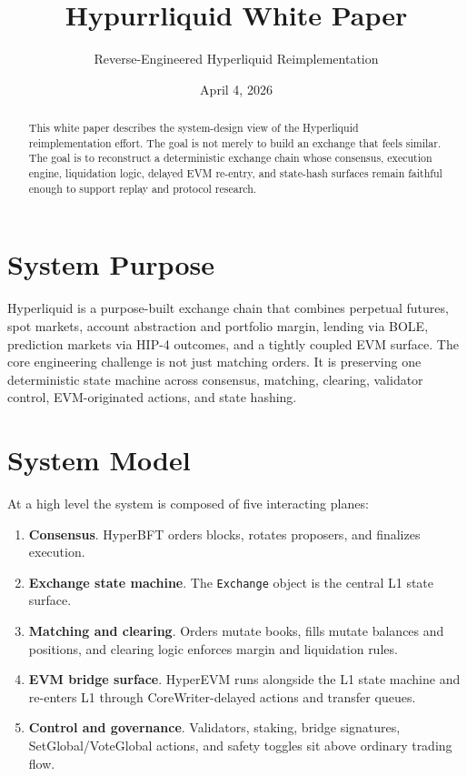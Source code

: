 \documentclass[11pt]{article}
\title{\textbf{Hypurrliquid White Paper}}
\author{Reverse-Engineered Hyperliquid Reimplementation}
\date{April 4, 2026}
\begin{document}
\maketitle

\begin{abstract}
This white paper describes the system-design view of the Hyperliquid
reimplementation effort. The goal is not merely to build an exchange that feels
similar. The goal is to reconstruct a deterministic exchange chain whose
consensus, execution engine, liquidation logic, delayed EVM re-entry, and
state-hash surfaces remain faithful enough to support replay and protocol
research.
\end{abstract}

\section{System Purpose}

Hyperliquid is a purpose-built exchange chain that combines perpetual futures,
spot markets, account abstraction and portfolio margin, lending via BOLE,
prediction markets via HIP-4 outcomes, and a tightly coupled EVM surface. The
core engineering challenge is not just matching orders. It is preserving one
deterministic state machine across consensus, matching, clearing, validator
control, EVM-originated actions, and state hashing.

\section{System Model}

At a high level the system is composed of five interacting planes:

\begin{enumerate}[leftmargin=1.4em]
  \item \textbf{Consensus}. HyperBFT orders blocks, rotates proposers, and finalizes execution.
  \item \textbf{Exchange state machine}. The \texttt{Exchange} object is the central L1 state surface.
  \item \textbf{Matching and clearing}. Orders mutate books, fills mutate balances and positions, and clearing logic enforces margin and liquidation rules.
  \item \textbf{EVM bridge surface}. HyperEVM runs alongside the L1 state machine and re-enters L1 through CoreWriter-delayed actions and transfer queues.
  \item \textbf{Control and governance}. Validators, staking, bridge signatures, SetGlobal/VoteGlobal actions, and safety toggles sit above ordinary trading flow.
\end{enumerate}
\end{document}
